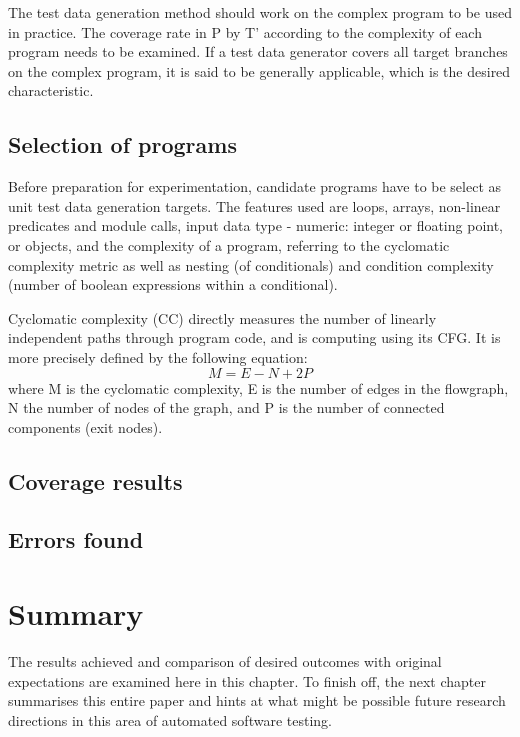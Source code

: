 \documentclass{icldt}
\numberwithin{equation}{section}       %
\begin{document}
{The test data generation method should work on the complex program to be used in practice. The coverage rate in P by T' according to the complexity of each program needs to be examined. If a test data generator covers all target branches on the complex program, it is said to be generally applicable, which is the desired characteristic.

\subsection{Selection of programs}
Before preparation for experimentation, candidate programs have to be select as unit test data generation targets. The features used are loops, arrays, non-linear predicates and module calls, input data type - numeric: integer or floating point, or objects, and the complexity of a program, referring to the cyclomatic complexity metric as well as nesting (of conditionals) and condition complexity (number of boolean expressions within a conditional).

Cyclomatic complexity (CC) directly measures the number of linearly independent paths through program code, and is computing using its CFG. It is more precisely defined by the following equation:
$$
	M = E - N + 2P
$$
where M is the cyclomatic complexity, E is the number of edges in the flowgraph, N the number of nodes of the graph, and P is the number of connected components (exit nodes).

\subsection{Coverage results}

\subsection{Errors found}


\section{Summary}
The results achieved and comparison of desired outcomes with original expectations are examined here in this chapter. To finish off, the next chapter summarises this entire paper and hints at what might be possible future research directions in this area of automated software testing.
}
\end{document}
